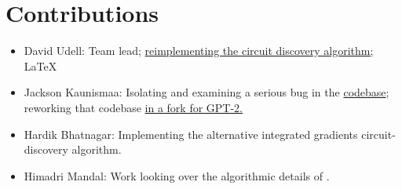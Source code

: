 \documentclass[10pt]{article}
\begin{document}
\section*{Contributions}
\begin{itemize}
\item David Udell: Team lead; \href{https://github.com/DavidUdell/sparse_circuit_discovery}{reimplementing the circuit discovery algorithm;} \LaTeX
\item Jackson Kaunismaa: Isolating and examining a serious bug in the \citet{Marks2024} \href{https://github.com/saprmarks/feature-circuits}{codebase}; reworking that codebase \href{https://github.com/JacksonKaunismaa/feature-circuits/tree/jvp-fix}{in a fork for GPT-2.}
\item Hardik Bhatnagar: Implementing the alternative integrated gradients circuit-discovery algorithm.
\item Himadri Mandal: Work looking over the algorithmic details of \citet{Marks2024}.
\end{itemize}



\end{document}
